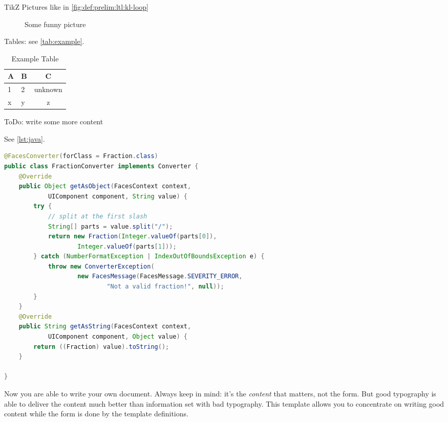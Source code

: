 TikZ Pictures like in \autoref{fig:def:prelim:ltl:kl-loop}
\begin{figure}
  \centering
  \caption{Some funny picture}
  \label{fig:def:prelim:ltl:kl-loop}
\end{figure}


Tables: see \autoref{tab:example}.

\begin{table}
	\centering
	\caption{Example Table}
	\label{tab:example}
	\begin{tabular}{llc}
	\toprule
	A & B & C\\
	\midrule
	1 & 2 & unknown\\
	x & y & z\\
	\bottomrule
	\end{tabular}
\end{table}

\begin{todobox}
ToDo: write some more content
\end{todobox}

See \autoref{lst:java}. 

\begin{lstlisting}[style=text,language=Java,label=lst:java,caption={Java Code Example}]
@FacesConverter(forClass = Fraction.class)
public class FractionConverter implements Converter {
    @Override
    public Object getAsObject(FacesContext context,
            UIComponent component, String value) {
        try {
            // split at the first slash
            String[] parts = value.split("/");
            return new Fraction(Integer.valueOf(parts[0]),
                    Integer.valueOf(parts[1]));
        } catch (NumberFormatException | IndexOutOfBoundsException e) {
            throw new ConverterException(
                    new FacesMessage(FacesMessage.SEVERITY_ERROR,
                            "Not a valid fraction!", null));
        }
    }
    @Override
    public String getAsString(FacesContext context,
            UIComponent component, Object value) {
        return ((Fraction) value).toString();
    }

}
\end{lstlisting}

Now you are able to write your own document. 
Always keep in mind: it's the \emph{content} that matters, not the form. 
But good typography is able to deliver the content much better than information set with bad typography. 
This template allows you to concentrate on writing good content while the form is done by the template definitions.